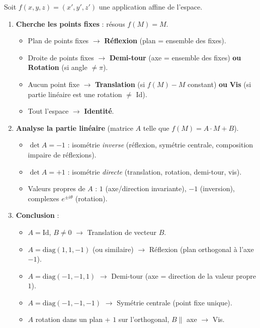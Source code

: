 \documentclass[11pt]{article}
\begin{document}
\begin{methode}
Soit $f(x,y,z) = (x',y',z')$ une application affine de l'espace.
\begin{enumerate}
\item \textbf{Cherche les points fixes} : résous $f(M)=M$.
\begin{itemize}
\item Plan de points fixes $\to$ \textbf{Réflexion} (plan = ensemble des fixes).
\item Droite de points fixes $\to$ \textbf{Demi-tour} (axe = ensemble des fixes) \textbf{ou} \textbf{Rotation} (si angle $\neq \pi$).
\item Aucun point fixe $\to$ \textbf{Translation} (si $f(M)-M$ constant) \textbf{ou} \textbf{Vis} (si partie linéaire est une rotation $\neq$ Id).
\item Tout l'espace $\to$ \textbf{Identité}.
\end{itemize}
\item \textbf{Analyse la partie linéaire} (matrice $A$ telle que $f(M)=A\cdot M + B$).
\begin{itemize}
\item $\det A = -1$ : isométrie \emph{inverse} (réflexion, symétrie centrale, composition impaire de réflexions).
\item $\det A = +1$ : isométrie \emph{directe} (translation, rotation, demi-tour, vis).
\item Valeurs propres de $A$ : $1$ (axe/direction invariante), $-1$ (inversion), complexes $e^{\pm i\theta}$ (rotation).
\end{itemize}
\item \textbf{Conclusion} :
\begin{itemize}
\item $A=\text{Id}$, $B\neq 0$ $\to$ Translation de vecteur $B$.
\item $A=\text{diag}(1,1,-1)$ (ou similaire) $\to$ Réflexion (plan orthogonal à l'axe $-1$).
\item $A=\text{diag}(-1,-1,1)$ $\to$ Demi-tour (axe = direction de la valeur propre $1$).
\item $A=\text{diag}(-1,-1,-1)$ $\to$ Symétrie centrale (point fixe unique).
\item $A$ rotation dans un plan + $1$ sur l'orthogonal, $B\parallel$ axe $\to$ Vis.
\end{itemize}
\end{enumerate}
\end{methode}
\end{document}
